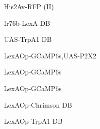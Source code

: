 \documentclass[17pt]{extarticle}
\begin{document}
\vspace*{\fill}
\newpage{}
\vspace*{\fill}\begin{normalsize}
His2Av-RFP (II) \\[0.5em]
\end{normalsize}
\footnotesize
\vspace*{\fill}
\newpage{}
\vspace*{\fill}\begin{normalsize}
Ir76b-LexA DB \\[0.5em]
\end{normalsize}
\footnotesize
\vspace*{\fill}
\newpage{}
\vspace*{\fill}\begin{normalsize}
UAS-TrpA1 DB \\[0.5em]
\end{normalsize}
\footnotesize
\vspace*{\fill}
\newpage{}
\vspace*{\fill}\begin{footnotesize}
LexAOp-GCaMP6s,UAS-P2X2 \\[0.5em]
\end{footnotesize}
\footnotesize
\vspace*{\fill}
\newpage{}
\vspace*{\fill}\begin{normalsize}
LexAOp-GCaMP6s \\[0.5em]
\end{normalsize}
\footnotesize
\vspace*{\fill}
\newpage{}
\vspace*{\fill}\begin{normalsize}
LexAOp-GCaMP6s \\[0.5em]
\end{normalsize}
\footnotesize
\vspace*{\fill}
\newpage{}
\vspace*{\fill}\begin{small}
LexAOp-Chrimson DB \\[0.5em]
\end{small}
\footnotesize
\vspace*{\fill}
\newpage{}
\vspace*{\fill}\begin{normalsize}
LexAOp-TrpA1 DB \\[0.5em]
\end{normalsize}
\end{document}
